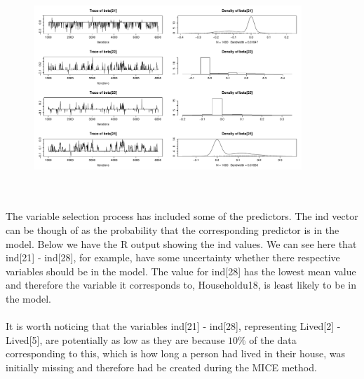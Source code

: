 \documentclass{article}
\begin{document}
\begin{figure}[h!]
\centering
\includegraphics[width = 0.9\textwidth]{notIncludedBetas.pdf}
\caption{}
\label{notIncluded}
\end{figure}
\\\\
The variable selection process has included some of the predictors. The \textsf{ind} vector can be though of as the probability that the corresponding predictor is in the model. Below we have the \textsf{R} output showing the \textsf{ind} values. We can see here that \textsf{ind[21] - ind[28]}, for example, have some uncertainty whether there respective variables should be in the model. The value for \textsf{ind[28]} has the lowest mean value and therefore the variable it corresponds to, \textsf{Householdu18}, is least likely to be in the model. 
\\\\
It is worth noticing that the variables \textsf{ind[21] - ind[28]}, representing Lived[2] - Lived[5], are potentially as low as they are because $10\%$ of the data corresponding to this, which is how long a person had lived in their house, was initially missing and therefore had be created during the MICE method.
\end{document}
